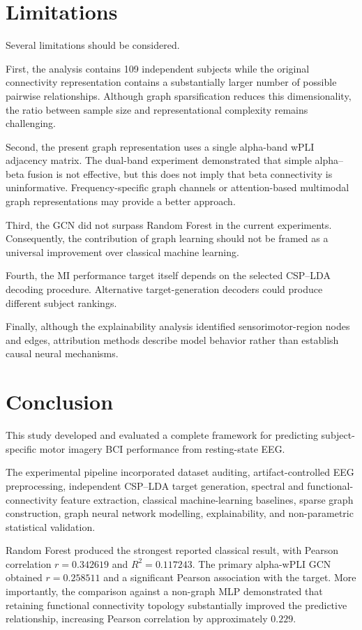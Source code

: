\documentclass[conference]{IEEEtran}
\begin{document}
\section{Limitations}
Several limitations should be considered.

First, the analysis contains 109 independent subjects while the original connectivity representation contains a substantially larger number of possible pairwise relationships. Although graph sparsification reduces this dimensionality, the ratio between sample size and representational complexity remains challenging.

Second, the present graph representation uses a single alpha-band wPLI adjacency matrix. The dual-band experiment demonstrated that simple alpha--beta fusion is not effective, but this does not imply that beta connectivity is uninformative. Frequency-specific graph channels or attention-based multimodal graph representations may provide a better approach.

Third, the GCN did not surpass Random Forest in the current experiments. Consequently, the contribution of graph learning should not be framed as a universal improvement over classical machine learning.

Fourth, the MI performance target itself depends on the selected CSP--LDA decoding procedure. Alternative target-generation decoders could produce different subject rankings.

Finally, although the explainability analysis identified sensorimotor-region nodes and edges, attribution methods describe model behavior rather than establish causal neural mechanisms.

\section{Conclusion}
This study developed and evaluated a complete framework for predicting subject-specific motor imagery BCI performance from resting-state EEG.

The experimental pipeline incorporated dataset auditing, artifact-controlled EEG preprocessing, independent CSP--LDA target generation, spectral and functional-connectivity feature extraction, classical machine-learning baselines, sparse graph construction, graph neural network modelling, explainability, and non-parametric statistical validation.

Random Forest produced the strongest reported classical result, with Pearson correlation $r = 0.342619$ and $R^2 = 0.117243$. The primary alpha-wPLI GCN obtained $r = 0.258511$ and a significant Pearson association with the target. More importantly, the comparison against a non-graph MLP demonstrated that retaining functional connectivity topology substantially improved the predictive relationship, increasing Pearson correlation by approximately $0.229$.
\end{document}
